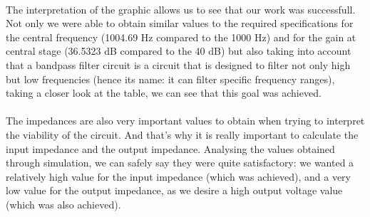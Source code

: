 \paragraph{}
The interpretation of the graphic allows us to see that our work was successfull. Not only we were able to obtain similar values to the required specifications for the central frequency (1004.69 Hz compared to the 1000 Hz) and for the gain at central stage (36.5323 dB compared to the 40 dB) but also taking into account that a bandpass filter circuit is a circuit that is designed to filter not only high but low frequencies (hence its name: it can filter specific frequency ranges), taking a closer look at the table, we can see that this goal was achieved.

\paragraph{}
The impedances are also very important values to obtain when trying to interpret the viability of the circuit. And that's why it is really important to calculate the input impedance and the output impedance. Analysing the values obtained through simulation, we can safely say they were quite satisfactory: we wanted a relatively high value for the input impedance (which was achieved), and a very low value for the output impedance, as we desire a high output voltage value (which was also achieved).

